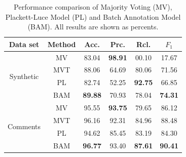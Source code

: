 \begin{table}[!t]
\centering
 {\caption{Performance comparison of Majority Voting (MV), Plackett-Luce Model (PL) and Batch Annotation Model (BAM).  
 All results are shown as percents.}\label{tab:performance}}
{

  \begin{tabular}{c|c||c|c|c|c}%
    \hline
        Data set & Method    & Acc.           & Prc.           & Rcl.           & $F_1$          \\ \hline \hline %
        \multirow{4}{*}{Synthetic}
                 & MV        & 83.04          & \textbf{98.91} & 00.10          & 17.67          \\ \cline{2-6} %
                 & MVT       & 88.06          & 64.69          & 80.06          & 71.56          \\ \cline{2-6} %
                 & PL        & 82.74          & 52.25          & \textbf{92.75} & 66.85          \\ \cline{2-6} %
                 & BAM       & \textbf{89.88} & 70.93          & 78.04          & \textbf{74.31} \\ \hline      %
        \multirow{4}{*}{Comments}
                 & MV        & 95.55          & \textbf{93.75} & 79.65          & 86.12          \\ \cline{2-6} %
                 & MVT       & 96.16          & 92.31          & 84.96          & 88.48          \\ \cline{2-6} %
                 & PL        & 94.62          & 85.45          & 83.19          & 84.30          \\ \cline{2-6} %
                 & BAM       & \textbf{96.77} & 93.40          & \textbf{87.61} & \textbf{90.41} \\ \hline      %
  \end{tabular}
}
\end{table}






